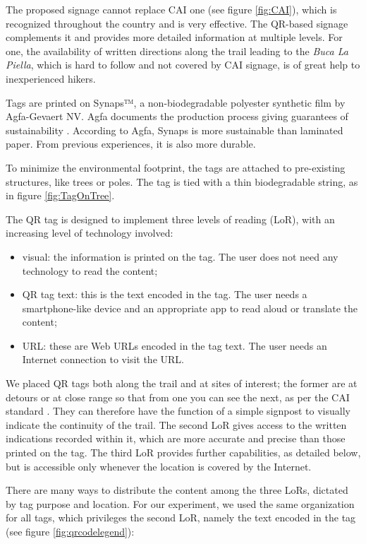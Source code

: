 \documentclass[sustainability,article,submit,pdftex,moreauthors]{Definitions/mdpi}
\begin{document}
The proposed signage cannot replace CAI one (see figure \ref{fig:CAI}), which is recognized throughout the country and is very effective. The QR-based signage complements it and provides more detailed information at multiple levels. For one, the availability of written directions along the trail leading to the \textit{Buca La Piella}, which is hard to follow and not covered by CAI signage, is of great help to inexperienced hikers.

Tags are printed on Synaps™, a non-biodegradable polyester synthetic film by Agfa-Gevaert NV. Agfa documents the production process giving guarantees of sustainability . According to Agfa, Synaps is more sustainable than laminated paper. From previous experiences, it is also more durable.

To minimize the environmental footprint, the tags are attached to pre-existing structures, like trees or poles. The tag is tied with a thin biodegradable string, as in figure \ref{fig:TagOnTree}.

The QR tag is designed to implement three levels of reading (LoR), with an increasing level of technology involved:
\begin{itemize}
    \item visual: the information is printed on the tag. The user does not need any technology to read the content;
    \item QR tag text: this is the text encoded in the tag. The user needs a smartphone-like device and an appropriate app to read aloud or translate the content;
    \item URL: these are Web URLs encoded in the tag text. The user needs an Internet connection to visit the URL.
\end{itemize}

We placed QR tags both along the trail and at sites of interest; the former are at detours or at close range so that from one you can see the next, as per the CAI standard \cite{cai10}. They can therefore have the function of a simple signpost to visually indicate the continuity of the trail. The second LoR gives access to the written indications recorded within it, which are more accurate and precise than those printed on the tag. The third LoR provides further capabilities, as detailed below, but is accessible only whenever the location is covered by the Internet. 

There are many ways to distribute the content among the three LoRs, dictated by tag purpose and location. For our experiment, we used the same organization for all tags, which privileges the second LoR, namely the text encoded in the tag (see figure \ref{fig:qrcodelegend}): 
\end{document}
